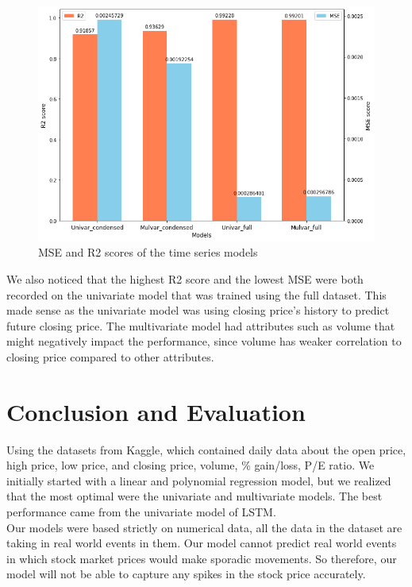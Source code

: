 \documentclass{article}
\begin{document}
\begin{figure}[H]
	\begin{center}
		\includegraphics[scale=0.45]{p11.png}\caption{MSE and R2 scores of the time series models}
	\end{center}
\end{figure}

We also noticed that the highest R2 score and the lowest MSE were both recorded on the univariate model that was trained using the full dataset. This made sense as the univariate model was using closing price's history to predict future closing price. The multivariate model had attributes such as volume that might negatively impact the performance, since volume has weaker correlation to closing price compared to other attributes.  

\section{Conclusion and Evaluation} 
Using the datasets from Kaggle, which contained daily data about the open price, high price, low price, and closing price, volume, \% gain/loss, P/E ratio. We initially started with a linear and polynomial regression model, but we realized that the most optimal were the univariate and multivariate models. The best performance came from the univariate model of LSTM.\\

Our models were based strictly on numerical data, all the data in the dataset are taking in real world events in them. Our model cannot predict real world events in which stock market prices would make sporadic movements. So therefore, our model will not be able to capture any spikes in the stock price accurately.\\
\end{document}
